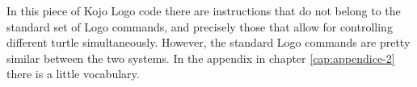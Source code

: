 \vskip 1cm

In this piece of Kojo Logo code there are instructions that do not belong to the standard set of Logo commands, and precisely those that allow for controlling different turtle simultaneously. However, the standard Logo commands are pretty similar between the two systems. In the appendix in chapter \ref{cap:appendice-2} there is a little vocabulary. 




